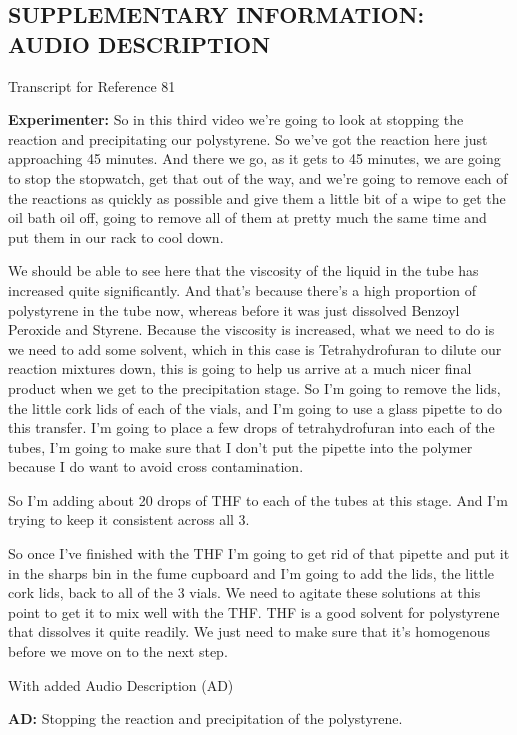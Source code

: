 \documentclass[11.5pt]{sig-alternate} %
\begin{document}
\clearpage
\begin{large}
\leftskip 0in
\parindent -0in
\section*{SUPPLEMENTARY INFORMATION: AUDIO DESCRIPTION}
Transcript for Reference 81

\textbf{Experimenter:} So in this third video we're going to look at stopping the reaction and precipitating our polystyrene. So we've got the reaction here just approaching 45 minutes. And there we go, as it gets to 45 minutes, we are going to stop the stopwatch, get that out of the way, and we're going to remove each of the reactions as quickly as possible and give them a little bit of a wipe to get the oil bath oil off, going to remove all of them at pretty much the same time and put them in our rack to cool down. 

We should be able to see here that the viscosity of the liquid in the tube has increased quite significantly. And that's because there's a high proportion of polystyrene in the tube now, whereas before it was just dissolved Benzoyl Peroxide and Styrene. Because the viscosity is increased, what we need to do is we need to add some solvent, which in this case is Tetrahydrofuran to dilute our reaction mixtures down, this is going to help us arrive at a much nicer final product when we get to the precipitation stage. So I'm going to remove the lids, the little cork lids of each of the vials, and I'm going to use a glass pipette to do this transfer. I'm going to place a few drops of tetrahydrofuran into each of the tubes, I'm going to make sure that I don't put the pipette into the polymer because I do want to avoid cross contamination. 

So I'm adding about 20 drops of THF to each of the tubes at this stage. And I'm trying to keep it consistent across all 3. 

So once I've finished with the THF I'm going to get rid of that pipette and put it in the sharps bin in the fume cupboard and I'm going to add the lids, the little cork lids, back to all of the 3 vials. We need to agitate these solutions at this point to get it to mix well with the THF. THF is a good solvent for polystyrene that dissolves it quite readily. We just need to make sure that it's homogenous before we move on to the next step. 

With added Audio Description (AD)

\textbf{AD:} Stopping the reaction and precipitation of the polystyrene. 


\end{large}
\end{document}
